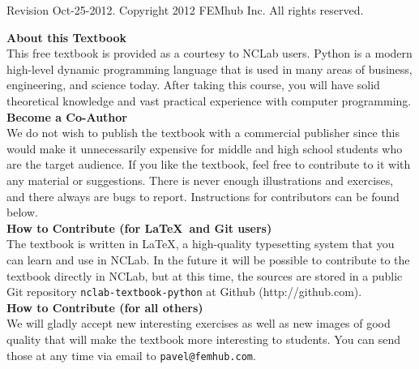 \documentclass[article,A4,12pt]{llncs}
\newif\iffullversion
\begin{document}
\begin{center}
\end{center}
\vbox{}
\vspace{5mm}
\begin{center}
\iffullversion
\else
\centerline{\huge \color{red}{PREVIEW}}
\fi
\vfill
\end{center}
\vfill
\vfill
\begin{center}
Revision Oct-25-2012. Copyright 2012 FEMhub Inc. All rights reserved.
\end{center}
\newpage
\vbox{}
\vfill
{
\noindent
{\bf About this Textbook}\\[4mm]
This free textbook is provided as a courtesy to NCLab users. 
Python is a modern high-level 
dynamic programming language that is used in many areas of business, 
engineering, and science today. After taking this course, you will 
have solid theoretical knowledge and vast practical experience with 
computer programming. \\[4mm]

\noindent
{\bf Become a Co-Author}\\[4mm]
We do not wish to publish the textbook with a commercial publisher since this 
would make it unnecessarily expensive for middle and high school students who
are the target audience. If you like the textbook, feel free to contribute 
to it with any material or suggestions. There is never enough illustrations and exercises, 
and there always are bugs to report. Instructions for contributors can be found 
below.\\[4mm]

\noindent
{\bf How to Contribute (for \LaTeX \ and Git users)}\\[4mm]
\noindent
The textbook is written in \LaTeX, a high-quality typesetting system that 
you can learn and use in NCLab. In the future it will be possible to contribute to 
the textbook directly in NCLab, but at this time, the sources are stored 
in a public Git repository {\tt nclab-textbook-python} at Github (http://github.com). \\[4mm]

\noindent
{\bf How to Contribute (for all others)}\\[4mm]
\noindent
We will gladly accept new interesting exercises as well as
new images of good quality that will make the textbook more interesting to students. You
can send those at any time via email to {\tt pavel@femhub.com}.\\[4mm]

}
\end{document}
